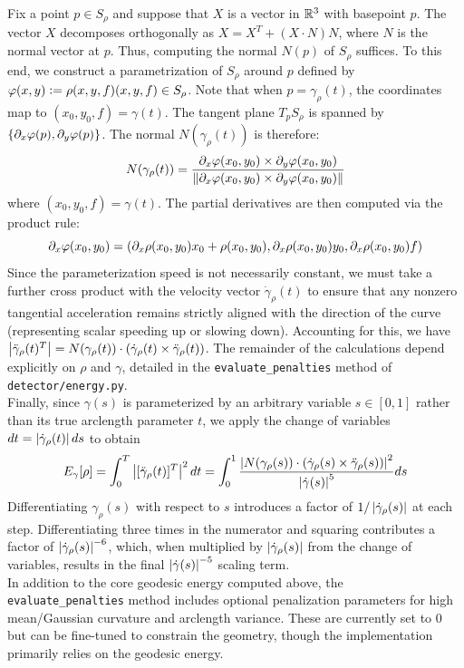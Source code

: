\documentclass{article}
\begin{document}
Fix a point $p \in S_\rho$ and suppose that $X$ is a vector in $\mathbb{R}^3$ with basepoint $p$. The vector $X$ decomposes orthogonally as $X = X^T + (X\cdot N) N$, where $N$ is the normal vector at $p$. Thus, computing the normal $N(p)$ of $S_\rho$ suffices. To this end, we construct a parametrization of $S_\rho$ around $p$ defined by $\varphi(x, y) \vcentcolon= \rho(x, y, f) (x, y, f) \in S_\rho$. Note that when $p = \gamma_\rho(t)$, the coordinates map to $(x_0, y_0, f) = \gamma(t)$. 
The tangent plane $T_p S_\rho$ is spanned by $\{\partial_x \varphi (p), \partial_y \varphi(p)\}$. The normal $N(\gamma_\rho(t))$ is therefore:
\[
  N(\gamma_\rho(t)) = \frac{\partial_x \varphi(x_0, y_0) \times \partial_y \varphi(x_0, y_0)}{\left\lVert \partial_x \varphi(x_0, y_0) \times \partial_y \varphi(x_0, y_0) \right\rVert}
\]
where $(x_0, y_0, f) = \gamma(t)$. The partial derivatives are then computed via the product rule:
\[
  \partial_x \varphi(x_0, y_0) = (\partial_x \rho(x_0, y_0) x_0 + \rho(x_0, y_0), \partial_x \rho(x_0, y_0) y_0, \partial_x \rho(x_0, y_0)f)
\]
Since the parameterization speed is not necessarily constant, we must take a further cross product with the velocity vector $\dot \gamma_\rho(t)$ to ensure that any nonzero tangential acceleration remains strictly aligned with the direction of the curve (representing scalar speeding up or slowing down). Accounting for this, we have $\left\lvert \ddot \gamma_\rho(t)^T \right\rvert = N(\gamma_\rho(t)) \cdot (\dot \gamma_\rho(t)\times \ddot \gamma_\rho(t))$. The remainder of the calculations depend explicitly on $\rho$ and $\gamma$, detailed in the \verb|evaluate_penalties| method of \verb|detector/energy.py|. \\

Finally, since $\gamma(s)$ is parameterized by an arbitrary variable $s \in [0, 1]$ rather than its true arclength parameter $t$, we apply the change of variables $dt = \left\lvert \dot \gamma_\rho(t) \right\rvert ds$ to obtain 
\[
  E_\gamma[\rho] = \int_0^T \left\lvert [\ddot \gamma_\rho(t)]^T \right\rvert^2 dt = \int_0^1\frac{\left\lvert N(\gamma_\rho(s)) \cdot (\dot \gamma_\rho(s)\times \ddot \gamma_\rho(s)) \right\rvert^2}{\left\lvert \dot\gamma(s) \right\rvert^5}ds
\]
Differentiating $\gamma_\rho(s)$ with respect to $s$ introduces a factor of $1/\left\lvert \dot \gamma_\rho(s) \right\rvert$ at each step. Differentiating three times in the numerator and squaring contributes a factor of $\left\lvert \dot \gamma_\rho(s) \right\rvert^{-6}$, which, when multiplied by $\left\lvert \dot \gamma_\rho(s) \right\rvert$ from the change of variables, results in the final $\left\lvert \dot \gamma(s) \right\rvert^{-5}$ scaling term. \\

In addition to the core geodesic energy computed above, the \verb|evaluate_penalties| method includes optional penalization parameters for high mean/Gaussian curvature and arclength variance. These are currently set to $0$ but can be fine-tuned to constrain the geometry, though the implementation primarily relies on the geodesic energy.
\end{document}
